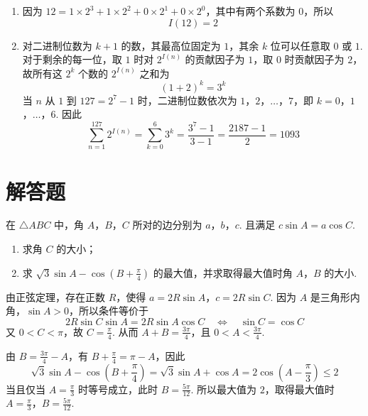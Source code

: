 \begin{solution}
\begin{enumerate}
\item
因为 \(12=1\times2^3+1\times2^2+0\times2^1+0\times2^0\)，其中有两个系数为 \(0\)，所以
\[
I(12)=2
\]

\item
对二进制位数为 \(k+1\) 的数，其最高位固定为 \(1\)，其余 \(k\) 位可以任意取 \(0\) 或 \(1\). 对于剩余的每一位，取 \(1\) 时对 \(2^{I(n)}\) 的贡献因子为 \(1\)，取 \(0\) 时贡献因子为 \(2\)，故所有这 \(2^k\) 个数的 \(2^{I(n)}\) 之和为
\[
(1+2)^k=3^k
\]
当 \(n\) 从 \(1\) 到 \(127=2^7-1\) 时，二进制位数依次为 \(1\)，\(2\)，\(\ldots\)，\(7\)，即 \(k=0\)，\(1\)，\(\ldots\)，\(6\). 因此
\[
\sum_{n=1}^{127}2^{I(n)}=\sum_{k=0}^{6}3^k=\frac{3^7-1}{3-1}=\frac{2187-1}{2}=1093
\]
\end{enumerate}
\end{solution}

\section{解答题}

\begin{problem}
在 \(\triangle ABC\) 中，角 \(A\)，\(B\)，\(C\) 所对的边分别为 \(a\)，\(b\)，\(c\). 且满足 \(c \sin A = a \cos C\).
\begin{enumerate}
\item 求角 \(C\) 的大小；
\item 求 \(\sqrt{3} \sin A - \cos \left(B + \frac{\pi}{4}\right)\) 的最大值，并求取得最大值时角 \(A\)，\(B\) 的大小.
\end{enumerate}
\end{problem}

\begin{solution}
由正弦定理，存在正数 \(R\)，使得 \(a=2R\sin A\)，\(c=2R\sin C\). 因为 \(A\) 是三角形内角，\(\sin A>0\)，所以条件等价于
\[
2R\sin C\sin A=2R\sin A\cos C\quad\Longleftrightarrow\quad \sin C=\cos C
\]
又 \(0<C<\pi\)，故 \(C=\frac{\pi}{4}\). 从而 \(A+B=\frac{3\pi}{4}\)，且 \(0<A<\frac{3\pi}{4}\).

由 \(B=\frac{3\pi}{4}-A\)，有 \(B+\frac{\pi}{4}=\pi-A\)，因此
\[
\sqrt{3}\sin A-\cos\left(B+\frac{\pi}{4}\right)=\sqrt{3}\sin A+\cos A=2\cos\left(A-\frac{\pi}{3}\right)\leqslant 2
\]
当且仅当 \(A=\frac{\pi}{3}\) 时等号成立，此时 \(B=\frac{5\pi}{12}\). 所以最大值为 \(2\)，取得最大值时 \(A=\frac{\pi}{3}\)，\(B=\frac{5\pi}{12}\).
\end{solution}


